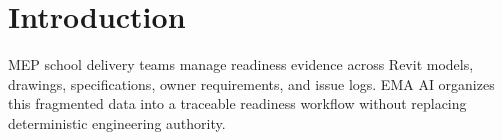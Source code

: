 \section{Introduction}
MEP school delivery teams manage readiness evidence across Revit models, drawings, specifications, owner requirements, and issue logs. EMA AI organizes this fragmented data into a traceable readiness workflow without replacing deterministic engineering authority.

